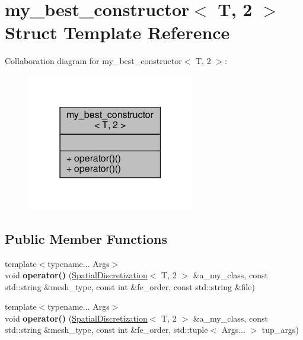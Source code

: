 \hypertarget{structmy__best__constructor_3_01T_00_012_01_4}{}\section{my\+\_\+best\+\_\+constructor$<$ T, 2 $>$ Struct Template Reference}
\label{structmy__best__constructor_3_01T_00_012_01_4}


Collaboration diagram for my\+\_\+best\+\_\+constructor$<$ T, 2 $>$\+:\nopagebreak
\begin{figure}[H]
\begin{center}
\leavevmode
\includegraphics[width=207pt]{structmy__best__constructor_3_01T_00_012_01_4__coll__graph}
\end{center}
\end{figure}
\subsection*{Public Member Functions}
\begin{DoxyCompactItemize}
\item 
\mbox{\label{structmy__best__constructor_3_01T_00_012_01_4_aefd44ec9fe4e6b6032e8d7b09680249b}} 
{\footnotesize template$<$typename... Args$>$ }\\void {\bfseries operator()} (\hyperlink{classSpatialDiscretization}{Spatial\+Discretization}$<$ T, 2 $>$ \&a\+\_\+my\+\_\+class, const std\+::string \&mesh\+\_\+type, const int \&fe\+\_\+order, const std\+::string \&file)
\item 
\mbox{\label{structmy__best__constructor_3_01T_00_012_01_4_a5796257f701b47bf376399a85d939b6a}} 
{\footnotesize template$<$typename... Args$>$ }\\void {\bfseries operator()} (\hyperlink{classSpatialDiscretization}{Spatial\+Discretization}$<$ T, 2 $>$ \&a\+\_\+my\+\_\+class, const std\+::string \&mesh\+\_\+type, const int \&fe\+\_\+order, std\+::tuple$<$ Args... $>$ tup\+\_\+args)
\end{DoxyCompactItemize}



